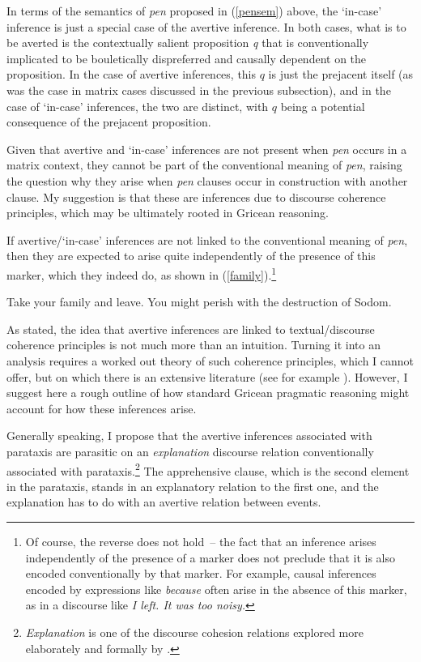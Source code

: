 \documentclass[output=paper,colorlinks,citecolor=brown]{langscibook}
\begin{document}
In terms of the semantics of \textit{pen} proposed in (\ref{pensem}) above, the `in-case' inference is just a special case of the avertive inference. In both cases, what is to be averted is the contextually salient proposition \textit{q} that is conventionally implicated to be bouletically dispreferred and causally dependent on the  proposition. In the case of avertive inferences, this $q$ is just the prejacent itself (as was the case in matrix cases discussed in the previous subsection), and in the case of `in-case' inferences, the two are distinct, with $q$ being a potential consequence of the prejacent proposition. 

Given that avertive and `in-case' inferences are not present when \textit{pen} occurs in a matrix context, they cannot be part of the conventional meaning of \textit{pen}, raising the  question why they arise when \textit{pen} clauses occur in construction with another clause. My suggestion  is that these are inferences due to discourse coherence principles, which may be ultimately rooted in Gricean reasoning. 

If avertive/`in-case' inferences are not linked to the conventional meaning of \textit{pen}, then they are expected to arise quite independently of the presence of this marker, which they indeed do, as shown in (\ref{family}).\footnote{Of course, the reverse does not hold~-- the fact that an inference arises independently of the presence of a marker does not preclude that it is also encoded conventionally by that marker. For example, causal inferences encoded by expressions like \textit{because} often arise in the absence of this marker, as in a discourse like \textit{I left. It was too noisy.}}

\ea
\label{family} Take your family and leave. You might perish with the destruction of Sodom. 
\z 

As stated, the idea that avertive inferences are linked to textual/discourse coherence principles is not much more than an intuition. Turning it into an analysis requires a worked out theory of such coherence principles, which I cannot offer, but on which there is an extensive literature (see for example \citealt{hobbs,lascarides93, lascarides03, asher-lascarides}). However, I suggest here a rough outline of how standard Gricean pragmatic reasoning might account for how these inferences arise.

Generally speaking, I propose that the avertive inferences associated with parataxis are parasitic on an \textit{explanation} discourse relation conventionally associated with  parataxis.\footnote{\textit{Explanation} is one of the discourse cohesion relations explored more elaborately and formally by \citet{asher-lascarides}.} The apprehensive clause, which is the second element in the parataxis, stands in an explanatory relation to the first one, and the explanation has to do with an avertive relation between events.
\end{document}
